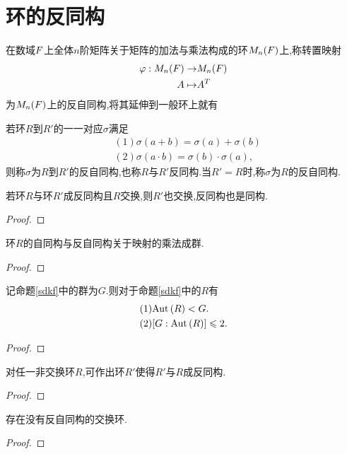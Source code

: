 \section{环的反同构}
在数域$\relax{F}$上全体$n$阶矩阵关于矩阵的加法与乘法构成的环$M_n(\relax{F})$上,称转置映射\begin{align*}
    \varphi:M_n(\relax{F})\to&M_n(\relax{F})\\
    A\mapsto&A^T
\end{align*}为$M_n(\relax{F})$上的反自同构,将其延伸到一般环上就有\begin{definition}\label{ftg}\label{fztg}
    若环$R$到$R'$的一一对应$\sigma$满足\begin{align*}
        &(1)\sigma(a+b)=\sigma(a)+\sigma(b)\\
        &(2)\sigma(a\cdot b)=\sigma(b)\cdot\sigma(a),
    \end{align*}则称$\sigma$为$R$到$R'$的反自同构,也称$R$与$R'$反同构.当$R'=R$时,称$\sigma$为$R$的反自同构.
\end{definition}
\begin{proposition}
    若环$R$与环$R'$成反同构且$R$交换,则$R'$也交换,反同构也是同构.
\end{proposition}
\begin{proof}
    \stars
\end{proof}
\begin{proposition}\label{sdkf}
    环$R$的自同构与反自同构关于映射的乘法成群.
\end{proposition}
\begin{proof}
    \stars
\end{proof}
\begin{proposition}
    记命题\ref{sdkf}中的群为$G$.则对于命题\ref{sdkf}中的$R$有\begin{align*}
        &(1)\mathrm{Aut}\,(R)<G.\\
        &(2)[G:\mathrm{Aut}\,(R)]\leqslant2.
    \end{align*}
\end{proposition}
\begin{proof}
    \stars
\end{proof}
\begin{proposition}
    对任一非交换环$R$,可作出环$R'$使得$R'$与$R$成反同构.
\end{proposition}
\begin{proof}
    \stars
\end{proof}
\begin{example}
    存在没有反自同构的交换环.
\end{example}
\begin{proof}
    \stars
\end{proof}